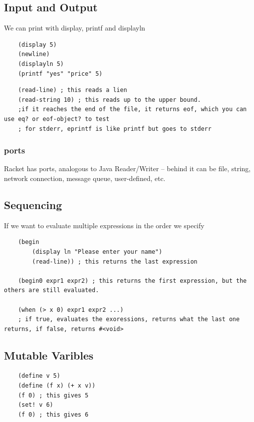 \documentclass[12pt]{article}
\begin{document}
\subsection{Input and Output}

We can print with display, printf and displayln

\begin{lstlisting}
	(display 5)
	(newline)
	(displayln 5)
	(printf "yes" "price" 5)
\end{lstlisting}

\begin{lstlisting}
	(read-line) ; this reads a lien
	(read-string 10) ; this reads up to the upper bound.
	;if it reaches the end of the file, it returns eof, which you can use eq? or eof-object? to test
	; for stderr, eprintf is like printf but goes to stderr
\end{lstlisting}

\subsubsection{ports}

Racket has ports, analogous to Java Reader/Writer -- behind it can be file, string, network connection, message queue, user-defined, etc.

\subsection{Sequencing}

If we want to evaluate multiple expressions in the order we specify

\begin{lstlisting}
	(begin
		(display ln "Please enter your name")
		(read-line)) ; this returns the last expression
		
	(begin0 expr1 expr2) ; this returns the first expression, but the others are still evaluated.
	
	(when (> x 0) expr1 expr2 ...)
	; if true, evaluates the exoressions, returns what the last one returns, if false, returns #<void>
\end{lstlisting}

\subsection{Mutable Varibles}

\begin{lstlisting}
	(define v 5)
	(define (f x) (+ x v))
	(f 0) ; this gives 5
	(set! v 6)
	(f 0) ; this gives 6
\end{lstlisting}
\end{document}
